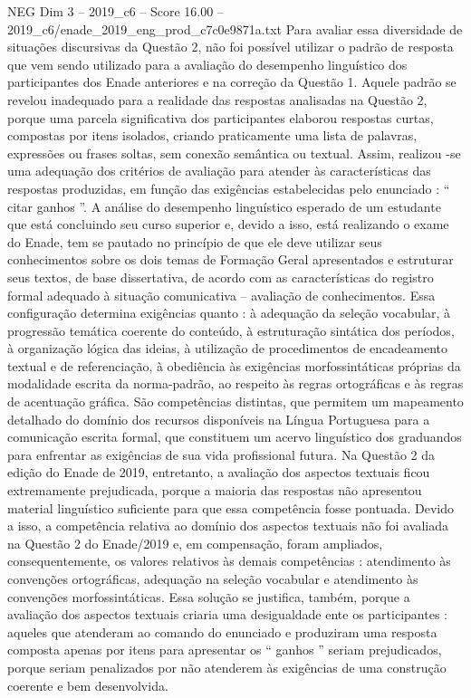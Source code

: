 \begin{textsample}{NEG Dim 3 – 2019\_c6 – Score 16.00 – 2019\_c6/enade\_2019\_eng\_prod\_c7c0e9871a.txt}
Para avaliar essa diversidade de situações discursivas da Questão 2, não foi possível utilizar o padrão de resposta que vem sendo utilizado para a avaliação do desempenho linguístico dos participantes dos Enade anteriores e na correção da Questão 1.
Aquele padrão se revelou inadequado para a realidade das respostas analisadas na Questão 2, porque uma parcela significativa dos participantes elaborou respostas curtas, compostas por itens isolados, criando praticamente uma lista de palavras, expressões ou frases soltas, sem conexão semântica ou textual.
Assim, realizou -se uma adequação dos critérios de avaliação para atender às características das respostas produzidas, em função das exigências estabelecidas pelo enunciado : “ citar ganhos ”.
A análise do desempenho linguístico esperado de um estudante que está concluindo seu curso superior e, devido a isso, está realizando o exame do Enade, tem se pautado no princípio de que ele deve utilizar seus conhecimentos sobre os dois temas de Formação Geral apresentados e estruturar seus textos, de base dissertativa, de acordo com as características do registro formal adequado à situação comunicativa – avaliação de conhecimentos.
Essa configuração determina exigências quanto : à adequação da seleção vocabular, à progressão temática coerente do conteúdo, à estruturação sintática dos períodos, à organização lógica das ideias, à utilização de procedimentos de encadeamento textual e de referenciação, à obediência às exigências morfossintáticas próprias da modalidade escrita da norma-padrão, ao respeito às regras ortográficas e às regras de acentuação gráfica.
São competências distintas, que permitem um mapeamento detalhado do domínio dos recursos disponíveis na Língua Portuguesa para a comunicação escrita formal, que constituem um acervo linguístico dos graduandos para enfrentar as exigências de sua vida profissional futura.
Na Questão 2 da edição do Enade de 2019, entretanto, a avaliação dos aspectos textuais ficou extremamente prejudicada, porque a maioria das respostas não apresentou material linguístico suficiente para que essa competência fosse pontuada.
Devido a isso, a competência relativa ao domínio dos aspectos textuais não foi avaliada na Questão 2 do Enade/2019 e, em compensação, foram ampliados, consequentemente, os valores relativos às demais competências : atendimento às convenções ortográficas, adequação na seleção vocabular e atendimento às convenções morfossintáticas.
Essa solução se justifica, também, porque a avaliação dos aspectos textuais criaria uma desigualdade ente os participantes : aqueles que atenderam ao comando do enunciado e produziram uma resposta composta apenas por itens para apresentar os “ ganhos ” seriam prejudicados, porque seriam penalizados por não atenderem às exigências de uma construção coerente e bem desenvolvida.

\end{textsample}
